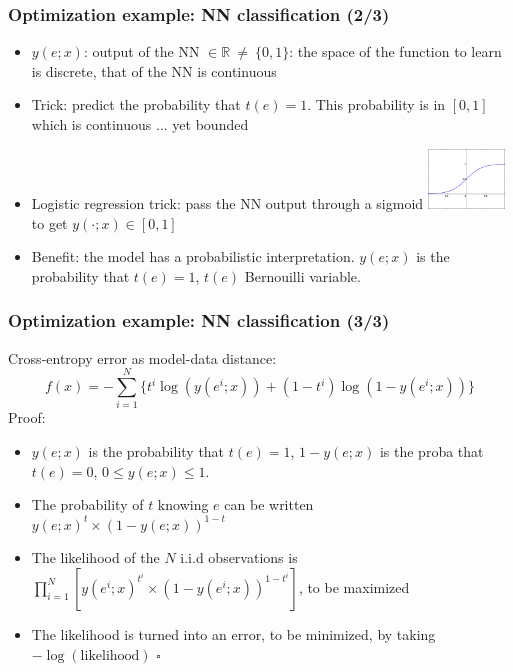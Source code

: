 \documentclass[12pt]{beamer}
\begin{document}
\begin{frame}
\frametitle{Optimization example: NN classification (2/3)}
\begin{itemize}
\item $y(e;x)$: output of the NN $\in \mathbb R ~\ne~ \{0,1\} $: the space of the function to learn is discrete, that of the NN is continuous 
\item Trick: predict the probability that $t(e)=1$. This probability is in $[0,1]$ which is continuous ... yet bounded 
\item Logistic regression trick: pass the NN output through a sigmoid 
\includegraphics[width=0.16\textwidth]{SigmoidFunction.png}
to get $y(\cdot ; x) \in [0,1]$ 
\item Benefit: the model has a probabilistic interpretation. $y(e;x)$ is the probability that $t(e)=1$, $t(e)$ Bernouilli variable.
\end{itemize}
\end{frame}

\begin{frame}
\frametitle{Optimization example: NN classification (3/3)}
\alert{Cross-entropy error} as model-data distance: 
\begin{equation*}
f(x) = - \sum_{i=1}^N \{ t^i \log(y(e^i;x)) + (1-t^i) \log(1 - y(e^i;x))\}
\end{equation*}
Proof:\\
\begin{itemize}
\item $y(e;x)$ is the probability that $t(e)=1$, $1-y(e;x)$ is the proba that $t(e)=0$, $0\le y(e;x) \le 1$.
\item The probability of $t$ knowing $e$ can be written $y(e;x)^{t}\times(1-y(e;x))^{1-t}$
\item The likelihood of the $N$ i.i.d observations is $\prod_{i=1}^N \left[y(e^i;x)^{t^i}\times(1-y(e^i;x))^{1-t^i}\right]$, to be maximized
\item The likelihood is turned into an error, to be minimized, by taking $-\log(\text{likelihood})$ \qquad $\square$
\end{itemize}
\end{frame}
\end{document}
